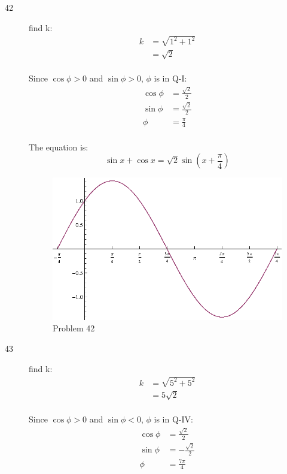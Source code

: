 \documentclass{exam}
\begin{document}
\begin{description}
      \item[42] 
        find k:
        \begin{align*}
          k & = \sqrt{1^2 + 1^2} \\
            & = \sqrt{2} \\
        \end{align*}

        Since $\cos \phi > 0$ and $\sin \phi > 0$, $\phi$ is in Q-I:
        \begin{align*}
          \cos \phi & = \frac{\sqrt{2}}{2} \\
          \sin \phi & = \frac{\sqrt{2}}{2} \\
          \phi      & = \frac{\pi}{4} \\
        \end{align*}

        The equation is:
        \[
          \sin x + \cos x = \boxed{ \sqrt{2} \sin \left( x + \frac{\pi}{4} \right) } 
        \]

        \begin{figure}[H]
          \centering
          \includegraphics[scale=0.8]{problem42.eps}
          \caption{Problem 42}
        \end{figure}

      \item[43] 
        find k:
        \begin{align*}
          k & = \sqrt{5^2 + 5^2} \\
            & = 5 \sqrt{2} \\
        \end{align*}

        Since $\cos \phi > 0$ and $\sin \phi < 0$, $\phi$ is in Q-IV:
        \begin{align*}
          \cos \phi & = \frac{\sqrt{2}}{2} \\
          \sin \phi & = - \frac{\sqrt{2}}{2} \\
          \phi      & = \frac{7 \pi}{4} \\
        \end{align*}


\end{description}
\end{document}
